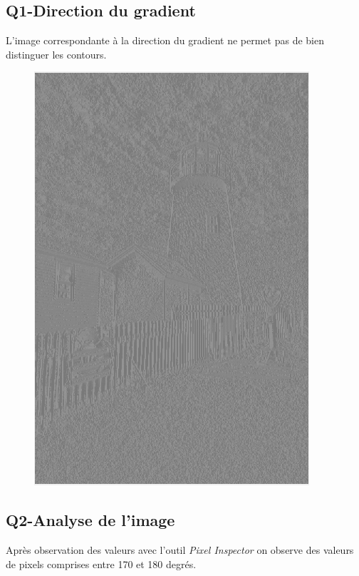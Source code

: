 \documentclass[a4paper,12pt]{report}
\begin{document}
\subsection*{Q1-Direction du gradient}
L'image correspondante à la direction du gradient ne permet pas de bien distinguer les contours.
\begin{figure}[!ht]
	\center
	\includegraphics[scale=0.4]{./imageResultats/partie2_q1.png}
\end{figure}
\subsection*{Q2-Analyse de l'image}
Après observation des valeurs avec  l'outil \emph{Pixel Inspector}  on observe des valeurs de pixels comprises entre 170 et 180 degrés.
\end{document}
